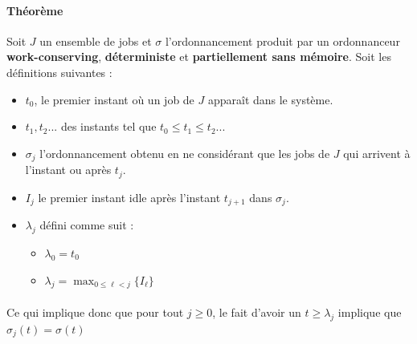 \paragraph{Théorème}
Soit $J$ un ensemble de jobs et $\sigma$ l'ordonnancement produit par un ordonnanceur \textbf{work-conserving}, \textbf{déterministe} et \textbf{partiellement sans mémoire}. Soit les définitions suivantes :
\begin{itemize}
\item $t_{0}$, le premier instant où un job de $J$ apparaît dans le système.
\item $t_{1}, t_{2}...$ des instants tel que $t_{0} \leq t_{1} \leq t_{2}...$
\item $\sigma_{j}$ l'ordonnancement obtenu en ne considérant que les jobs de $J$ qui arrivent à l'instant ou après $t_{j}$.
\item $I_{j}$ le premier instant idle après l'instant $t_{j+1}$ dans $\sigma_{j}$.
\item $\lambda_{j}$ défini comme suit :
  \begin{itemize}
  	\item $\lambda_{0} = t_{0}$
    \item $\lambda_{j} = \max_{0 \leq \ell < j}\{I_{\ell}\}$
  \end{itemize}
\end{itemize}
\paragraph{}
Ce qui implique donc que pour tout $j \geq 0$, le fait d'avoir un $t \geq \lambda_{j}$ implique que $\sigma_{j}(t) = \sigma(t)$

